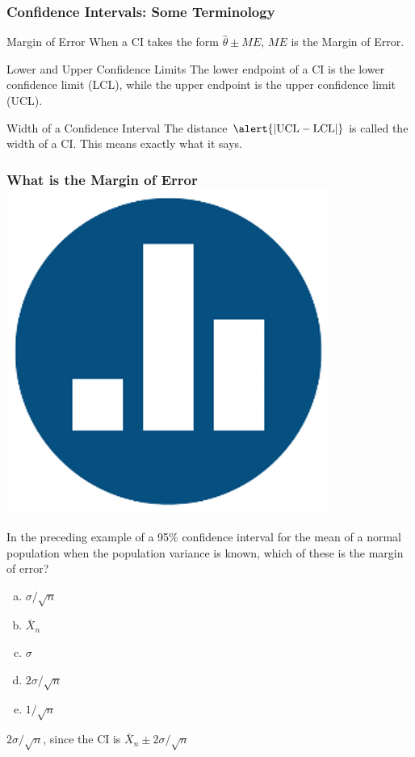 \documentclass[handout]{beamer}
\begin{document}
\begin{frame}
\frametitle{Confidence Intervals: Some Terminology}
\begin{block}{Margin of Error}
When a CI takes the form $\widehat{\theta}\pm ME$, $ME$ is the Margin of Error. 
\end{block}
\pause
\begin{block}{Lower and Upper Confidence Limits}
The lower endpoint of a CI is the \alert{lower confidence limit (LCL)}, while the upper endpoint is the \alert{upper confidence limit (UCL)}.
\end{block}
\pause
\begin{block}{Width of a Confidence Interval}
The distance $\alert{|\mbox{UCL} - \mbox{LCL}|}$ is called the \alert{width} of a CI. This means exactly what it says. 
\end{block}

\end{frame}
\begin{frame}
\frametitle{What is the Margin of Error\hfill \includegraphics[scale = 0.05]{./images/clicker}}
In the preceding example of a  95\% confidence interval for the mean of a normal population when the population variance is known, which of these is the margin of error?
	\begin{enumerate}[(a)]
		\item $\sigma/\sqrt{n}$
		\item $\bar{X}_n$
		\item $\sigma$
		\item $2\sigma/\sqrt{n}$
		\item $1/\sqrt{n}$
	\end{enumerate}
\pause
\vspace{1em}
\alert{\large $2\sigma/\sqrt{n}$, since the CI is $\bar{X}_n \pm 2\sigma/\sqrt{n}$}
\end{frame}
\end{document}
